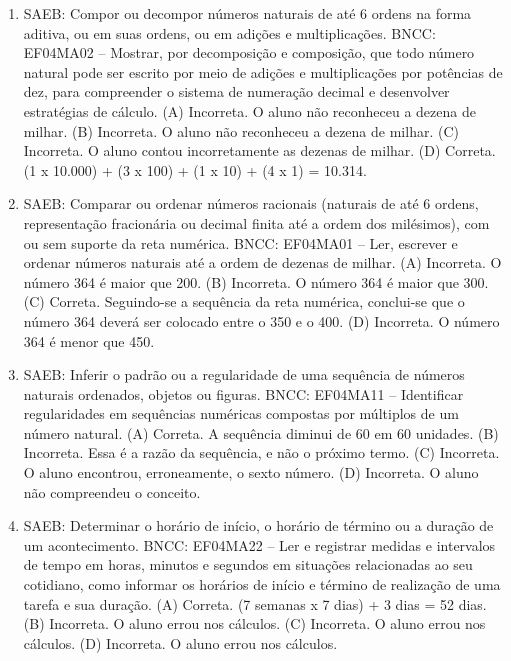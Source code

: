\begin{enumerate}
\item
SAEB: Compor ou decompor números naturais de até 6 ordens na
forma aditiva, ou em suas ordens, ou em adições e multiplicações.
BNCC: EF04MA02 -- Mostrar, por decomposição e composição, que todo número natural pode ser escrito
por meio de adições e multiplicações por potências de dez, para compreender o sistema de
numeração decimal e desenvolver estratégias de cálculo.
(A) Incorreta. O aluno não reconheceu a dezena de milhar.
(B) Incorreta. O aluno não reconheceu a dezena de milhar.
(C) Incorreta. O aluno contou incorretamente as dezenas de milhar.
(D) Correta. (1 x 10.000) + (3 x 100) + (1 x 10) + (4 x 1) = 10.314.

\item
SAEB: Comparar ou ordenar números
racionais (naturais de até 6 ordens, representação fracionária ou
decimal finita até a ordem dos milésimos), com ou sem suporte da reta
numérica.
BNCC: EF04MA01 -- Ler, escrever e ordenar números naturais até a ordem de dezenas de milhar.
(A) Incorreta. O número 364 é maior que 200.
(B) Incorreta. O número 364 é maior que 300.
(C) Correta. Seguindo-se a sequência da reta numérica, conclui-se que o número 364 deverá
ser colocado entre o 350 e o 400.
(D) Incorreta. O número 364 é menor que 450.

\item
SAEB: Inferir o padrão ou a regularidade de uma sequência de
números naturais ordenados, objetos ou figuras.
BNCC: EF04MA11 -- Identificar regularidades em sequências numéricas compostas por múltiplos de um
número natural.
(A) Correta. A sequência diminui de 60 em 60 unidades.
(B) Incorreta. Essa é a razão da sequência, e não o próximo termo.
(C) Incorreta. O aluno encontrou, erroneamente, o sexto número.
(D) Incorreta. O aluno não compreendeu o conceito.

\item
SAEB: Determinar o horário de início, o horário de término ou
a duração de um acontecimento.
BNCC: EF04MA22 -- Ler e registrar medidas e intervalos de tempo em horas, minutos e segundos em
situações relacionadas ao seu cotidiano, como informar os horários de início e término de realização
de uma tarefa e sua duração.
(A) Correta. (7 semanas x 7 dias) + 3 dias = 52 dias.
(B) Incorreta. O aluno errou nos cálculos.
(C) Incorreta. O aluno errou nos cálculos.
(D) Incorreta. O aluno errou nos cálculos.


\end{enumerate}
